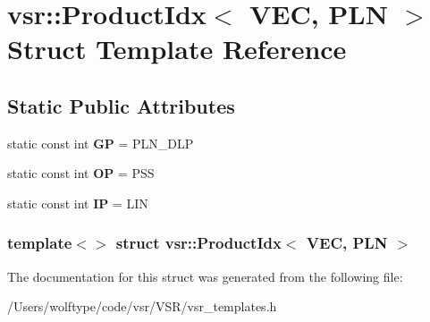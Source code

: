 \hypertarget{structvsr_1_1_product_idx_3_01_v_e_c_00_01_p_l_n_01_4}{\section{vsr\-:\-:Product\-Idx$<$ V\-E\-C, P\-L\-N $>$ Struct Template Reference}
\label{structvsr_1_1_product_idx_3_01_v_e_c_00_01_p_l_n_01_4}
}
\subsection*{Static Public Attributes}
\begin{DoxyCompactItemize}
\item 
\hypertarget{structvsr_1_1_product_idx_3_01_v_e_c_00_01_p_l_n_01_4_a7f16799cd3386102ccb72bf48d242c10}{static const int {\bfseries G\-P} = P\-L\-N\-\_\-\-D\-L\-P}\label{structvsr_1_1_product_idx_3_01_v_e_c_00_01_p_l_n_01_4_a7f16799cd3386102ccb72bf48d242c10}

\item 
\hypertarget{structvsr_1_1_product_idx_3_01_v_e_c_00_01_p_l_n_01_4_a8c79bbbe4b27bfb52c17d0165b80a756}{static const int {\bfseries O\-P} = P\-S\-S}\label{structvsr_1_1_product_idx_3_01_v_e_c_00_01_p_l_n_01_4_a8c79bbbe4b27bfb52c17d0165b80a756}

\item 
\hypertarget{structvsr_1_1_product_idx_3_01_v_e_c_00_01_p_l_n_01_4_a7347bfd1d09b65ab45a3d6575c2a2d86}{static const int {\bfseries I\-P} = L\-I\-N}\label{structvsr_1_1_product_idx_3_01_v_e_c_00_01_p_l_n_01_4_a7347bfd1d09b65ab45a3d6575c2a2d86}

\end{DoxyCompactItemize}
\subsubsection*{template$<$$>$ struct vsr\-::\-Product\-Idx$<$ V\-E\-C, P\-L\-N $>$}



The documentation for this struct was generated from the following file\-:\begin{DoxyCompactItemize}
\item 
/\-Users/wolftype/code/vsr/\-V\-S\-R/vsr\-\_\-templates.\-h\end{DoxyCompactItemize}
